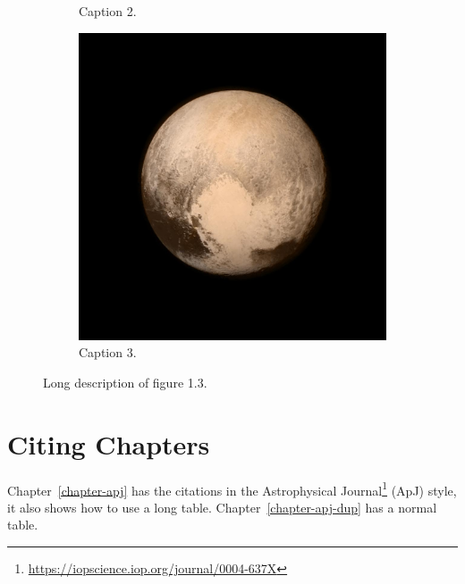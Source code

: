 \begin{figure}[htb!]
\begin{subfigure}{0.35\linewidth}
\caption{Caption 2.}\label{fig3-b}
\end{subfigure}
\begin{subfigure}{0.24\linewidth}
\center
\includegraphics[width=\textwidth]{figures/PIA19708-orig.jpg}
\caption{Caption 3.}\label{fig3-c}
\end{subfigure}
\caption[Short description of figure 1.3.]{Long description of figure 1.3.}\label{fig3}
\end{figure}
\section{Citing Chapters}
Chapter~\ref{chapter-apj} has the citations in the Astrophysical Journal\footnote{\url{https://iopscience.iop.org/journal/0004-637X}} (ApJ) style, it also shows how to use a long table. Chapter~\ref{chapter-apj-dup} has a normal table.
